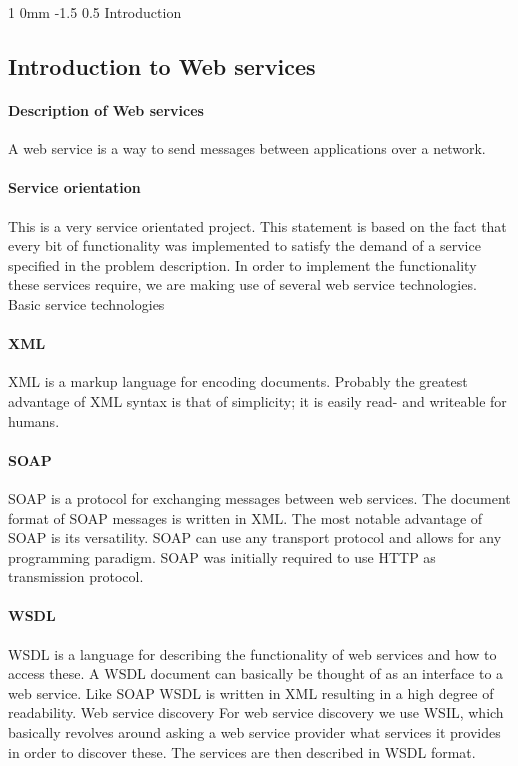 \documentclass[english, a4paper, 12pt]{article}
\makeatletter
\renewcommand{\section}{\@startsection
{section}%
{1}%
{0mm}%
{-1.5\baselineskip}%
{0.5\baselineskip}%
{\normalfont\Large\bfseries}} %
\makeatother
\begin{document}


\section{Introduction}

\subsection{Introduction to Web services}
\paragraph{Description of Web services}
A web service is a way to send messages between applications over a network.

\paragraph{Service orientation}
This is a very service orientated project. This statement is based on the fact that every bit of functionality was implemented to satisfy the demand of a service specified in the problem description. In order to implement the functionality these services require, we are making use of several web service technologies.
Basic service technologies

\paragraph{XML}
XML is a markup language for encoding documents. Probably the greatest advantage of XML syntax is that of simplicity; it is easily read- and writeable for humans.

\paragraph{SOAP}
SOAP is a protocol for exchanging messages between web services. The document format of SOAP messages is written in XML. The most notable advantage of SOAP is its versatility. SOAP can use any transport protocol and allows for any programming paradigm. SOAP was initially required to use HTTP as transmission protocol.

\paragraph{WSDL}
WSDL is a language for describing the functionality of web services and how to access these. A WSDL document can basically be thought of as an interface to a web service. Like SOAP WSDL is written in XML resulting in a high degree of readability.
Web service discovery
For web service discovery we use WSIL, which basically revolves around asking a web service provider what services it provides in order to discover these. The services are then described in WSDL format.
\end{document}
